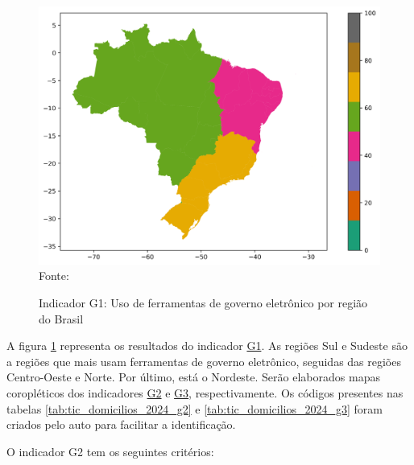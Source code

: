 \begin{figure}[H]
	\centering
	\caption{Indicador G1: Uso de ferramentas de governo eletrônico por região do Brasil}
	\includegraphics[width=1\linewidth]{figuras/mapa_coropleto_tic_domicilio_g1}
	\label{fig:mapa_coropleto_tic_domicilio_g1}
	\footnotesize{Fonte: \cite{tic_domicilios_2024_g1}}
\end{figure}

A figura \ref{fig:mapa_coropleto_tic_domicilio_g1} representa os resultados do indicador \href{https://cetic.br/pt/tics/domicilios/2024/individuos/G1/}{G1}. As regiões Sul e Sudeste são a regiões que mais usam ferramentas de governo eletrônico, seguidas das regiões Centro-Oeste e Norte. Por último, está o Nordeste. Serão elaborados mapas coropléticos dos indicadores \href{https://cetic.br/pt/tics/domicilios/2024/individuos/G2/}{G2} e \href{https://cetic.br/pt/tics/domicilios/2024/individuos/G3/}{G3}, respectivamente. Os códigos presentes nas tabelas \ref{tab:tic_domicilios_2024_g2} e \ref{tab:tic_domicilios_2024_g3} foram criados pelo auto para facilitar a identificação.

O indicador G2 tem os seguintes critérios:

